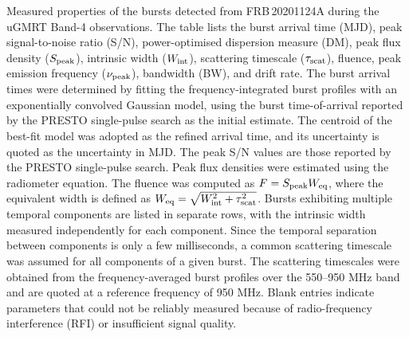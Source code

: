 \documentclass[preprint2, trackchanges]{aastex631}
\begin{document}
\vspace{-0.2cm}
{\footnotesize

Measured properties of the bursts detected from FRB\,20201124A during the uGMRT Band-4 observations. The table lists the burst arrival time (MJD), peak signal-to-noise ratio (S/N), power-optimised dispersion measure (DM), peak flux density ($S_{\rm peak}$), intrinsic width ($W_{\rm int}$), scattering timescale {($\tau_{\rm scat}$)}, fluence, peak emission frequency ($\nu_{\rm peak}$), bandwidth (BW), and drift rate. The burst arrival times were determined by fitting the frequency-integrated burst profiles with an exponentially convolved Gaussian model, using the burst time-of-arrival reported by the PRESTO single-pulse search as the initial estimate. The centroid of the best-fit model was adopted as the refined arrival time, and its uncertainty is quoted as the uncertainty in MJD. The peak S/N values are those reported by the PRESTO single-pulse search. Peak flux densities were estimated using the radiometer equation. The fluence was computed as $F = S_{\rm peak}W_{\rm eq}$, where the equivalent width is defined as $W_{\rm eq}=\sqrt{W_{\rm int}^{2}+ \tau_{\rm scat}^{2}}$. Bursts exhibiting multiple temporal components are listed in separate rows, with the intrinsic width measured independently for each component. Since the temporal separation between components is only a few milliseconds, a common scattering timescale was assumed for all components of a given burst. The scattering timescales were obtained from the frequency-averaged burst profiles over the 550--950 MHz band and are quoted at a reference frequency of 950 MHz. Blank entries indicate parameters that could not be reliably measured because of radio-frequency interference (RFI) or insufficient signal quality.}








% 


\end{document}
